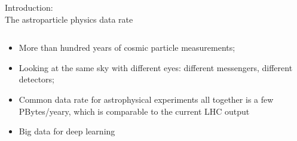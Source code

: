 \begin{frame}{Introduction: \\The astroparticle physics data rate}
\begin{columns}
\begin{column}[t]{0.53\textwidth}
    \begin{itemize}
    \item More than hundred years of cosmic particle measurements;
    \item Looking at the same sky with different eyes: different messengers, different detectors;
    \item Common data rate for astrophysical experiments all together is a few PBytes/yeary, which is comparable to the current LHC output\footnotemark[1] %
    \item Big data for deep learning
    \end{itemize}

  \end{column}
\end{columns}
  \footnotesize{}
\end{frame}

